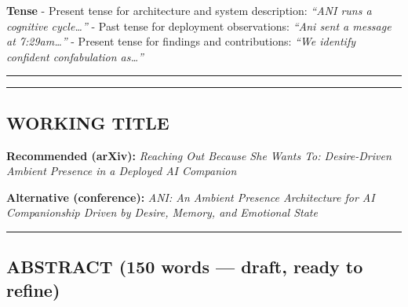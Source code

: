 \textbf{Tense} - Present tense for architecture and system description:
\emph{``ANI runs a cognitive cycle\ldots{}''} - Past tense for
deployment observations: \emph{``Ani sent a message at 7:29am\ldots{}''}
- Present tense for findings and contributions: \emph{``We identify
confident confabulation as\ldots{}''}

\begin{center}\rule{0.5\linewidth}{0.5pt}\end{center}

\begin{center}\rule{0.5\linewidth}{0.5pt}\end{center}

\subsection{WORKING TITLE}\label{working-title}

\textbf{Recommended (arXiv):} \emph{Reaching Out Because She Wants To:
Desire-Driven Ambient Presence in a Deployed AI Companion}

\textbf{Alternative (conference):} \emph{ANI: An Ambient Presence
Architecture for AI Companionship Driven by Desire, Memory, and
Emotional State}

\begin{center}\rule{0.5\linewidth}{0.5pt}\end{center}

\subsection{ABSTRACT (150 words --- draft, ready to
refine)}\label{abstract-150-words-draft-ready-to-refine}

